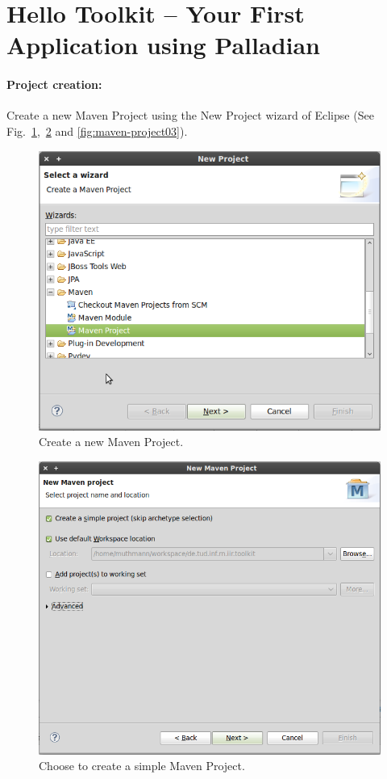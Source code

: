 \documentclass[a4paper,twoside]{book}      %
\begin{document}
\section{Hello Toolkit -- Your First Application using Palladian}
\paragraph{Project creation:} Create a new Maven Project using the New Project wizard of Eclipse (See Fig.~\ref{fig:maven-project01},~\ref{fig:maven-project02} and \ref{fig:maven-project03}).
\begin{figure}
\centering
\includegraphics[width=\textwidth]{img/ht01.png}
\caption{Create a new Maven Project.}
\label{fig:maven-project01}
\end{figure}
\begin{figure}
\centering
\includegraphics[width=\textwidth]{img/ht02.png}
\caption{Choose to create a simple Maven Project.}
\label{fig:maven-project02}
\end{figure}
\end{document}
